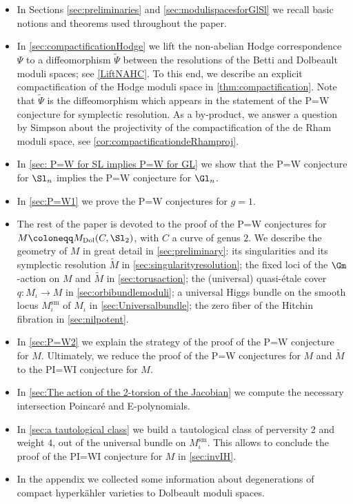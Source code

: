 \begin{itemize}
\item In Sections \ref{sec:preliminaries} and \ref{sec:modulispacesforGlSl} we recall basic notions and theorems used throughout the paper.
\item In \cref{sec:compactificationHodge} we lift the non-abelian Hodge correspondence $\Psi$ to a diffeomorphism $\widetilde{\Psi}$ between the resolutions of the Betti and Dolbeault moduli spaces; see \cref{LiftNAHC}. To this end, we describe an explicit compactification of the Hodge moduli space in \cref{thm:compactification}. Note that $\widetilde{\Psi}$ is the diffeomorphism which appears in the statement of the P=W conjecture for symplectic resolution. As a by-product, we answer a question by Simpson about the projectivity of the compactification of the de Rham moduli space, see \cref{cor:compactificationdeRhamproj}.
\item In \cref{sec: P=W for SL implies P=W for GL} we show that the P=W conjecture for $\Sl_n$ implies the P=W conjecture for $\Gl_n$.\enlargethispage{1\baselineskip}%
\item In \cref{sec:P=W1} we prove the P=W conjectures for $g=1$.
\item The rest of the paper is devoted to the proof of the P=W conjectures for $M \coloneqq M_{\mathrm{Dol}}(C, \Sl_2)$, with $C$ a curve of genus $2$. We describe the geometry of $M$ in great detail in \cref{sec:preliminary}: its singularities and its symplectic resolution $\widetilde{M}$ in \cref{sec:singularityresolution}; the fixed loci of the $\Gm$\nobreakdash-action on $M$ and $\widetilde{M}$ in \cref{sec:torusaction}; the (universal) quasi-étale cover $q\colon M_{\iota} \to M$ in \cref{sec:orbibundlemoduli}; a universal Higgs bundle on the smooth locus $M^{\mathrm{sm}}_{\iota}$ of $M_{\iota}$ in \cref{sec:Universalbundle}; the zero fiber of the Hitchin fibration in \cref{sec:nilpotent}.
\item In \cref{sec:P=W2} we explain the strategy of the proof of the P=W conjecture for $M$. Ultimately, we reduce the proof of the P=W conjectures for $M$ and $\widetilde{M}$ to the PI=WI conjecture for $M$.
\item In \cref{sec:The action of the 2-torsion of the Jacobian} we compute the necessary intersection Poincaré and E\nobreakdash-poly\-no\-mials.
\item In \cref{sec:a tautological class} we build a tautological class of perversity $2$ and weight $4$, out of the universal bundle on $M^{\mathrm{sm}}_{\iota}$. This allows to conclude the proof of the PI=WI conjecture for $M$ in \cref{sec:invIH}.
\item In the appendix we collected some information about degenerations of compact hyperkähler varieties to Dolbeault moduli spaces.
\end{itemize}

